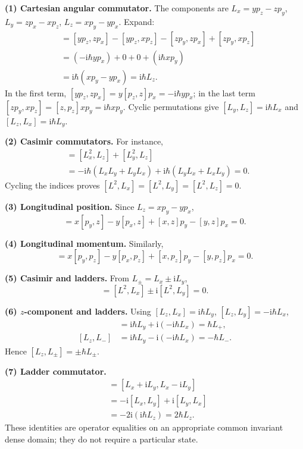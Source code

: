 \documentclass[11pt,a4paper]{article}
\newcommand{\iu}{\mathrm{i}}
\begin{document}
\textbf{(1) Cartesian angular commutator.} The components are \(L_x=yp_z-zp_y\), \(L_y=zp_x-xp_z\), \(L_z=xp_y-yp_x\). Expand:
\begin{align}
[L_x,L_y]&=[yp_z,zp_x]-[yp_z,xp_z]-[zp_y,zp_x]+[zp_y,xp_z]\\
&=(-\iu\hbar yp_x)+0+0+(\iu\hbar xp_y)\\
&=\iu\hbar(xp_y-yp_x)=\boxed{\iu\hbar L_z}.
\end{align}
In the first term, \([yp_z,zp_x]=y[p_z,z]p_x=-\iu\hbar yp_x\); in the last term \([zp_y,xp_z]=[z,p_z]xp_y=\iu\hbar xp_y\). Cyclic permutations give \([L_y,L_z]=\iu\hbar L_x\) and \([L_z,L_x]=\iu\hbar L_y\).

\textbf{(2) Casimir commutators.} For instance,
\begin{align}
[L^2,L_z]&=[L_x^2,L_z]+[L_y^2,L_z]\\
&=-\iu\hbar(L_xL_y+L_yL_x)+\iu\hbar(L_yL_x+L_xL_y)=0.
\end{align}
Cycling the indices proves \(\boxed{[L^2,L_x]=[L^2,L_y]=[L^2,L_z]=0}\).

\textbf{(3) Longitudinal position.} Since \(L_z=xp_y-yp_x\),
\begin{equation}[L_z,z]=x[p_y,z]-y[p_x,z]+[x,z]p_y-[y,z]p_x=\boxed0.\end{equation}

\textbf{(4) Longitudinal momentum.} Similarly,
\begin{equation}[L_z,p_z]=x[p_y,p_z]-y[p_x,p_z]+[x,p_z]p_y-[y,p_z]p_x=\boxed0.\end{equation}

\textbf{(5) Casimir and ladders.} From \(L_\pm=L_x\pm\iu L_y\),
\begin{equation}[L^2,L_\pm]=[L^2,L_x]\pm\iu[L^2,L_y]=\boxed0.\end{equation}

\textbf{(6) \(z\)-component and ladders.} Using \([L_z,L_x]=\iu\hbar L_y\), \([L_z,L_y]=-\iu\hbar L_x\),
\begin{align}
[L_z,L_+]&=\iu\hbar L_y+\iu(-\iu\hbar L_x)=\hbar L_+,\\
[L_z,L_-]&=\iu\hbar L_y-\iu(-\iu\hbar L_x)=-\hbar L_-.
\end{align}
Hence \(\boxed{[L_z,L_\pm]=\pm\hbar L_\pm}\).

\textbf{(7) Ladder commutator.}
\begin{align}
[L_+,L_-]&=[L_x+\iu L_y,L_x-\iu L_y]\\
&=-\iu[L_x,L_y]+\iu[L_y,L_x]\\
&=-2\iu(\iu\hbar L_z)=\boxed{2\hbar L_z}.
\end{align}
These identities are operator equalities on an appropriate common invariant dense domain; they do not require a particular state.
\end{document}

